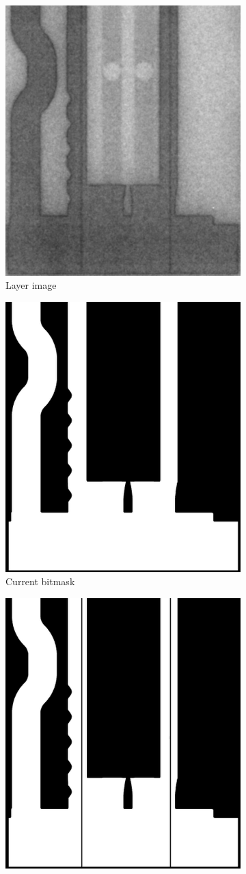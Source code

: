 \begin{figure}[!h]
\centering
\begin{subfigure}{.33\textwidth}
  \centering
  \includegraphics[width=.5\linewidth]{images/introduction/bitmask_integration/layer_00830}
  \caption{Layer image}
\end{subfigure}%
\begin{subfigure}{.33\textwidth}
  \centering
  \includegraphics[width=.5\linewidth]{images/introduction/bitmask_integration/bitmask_00830}
  \caption{Current bitmask}
\end{subfigure}
\begin{subfigure}{.33\textwidth}
  \centering
  \includegraphics[width=.5\linewidth]{images/introduction/bitmask_integration/bitmask_00829}

\end{subfigure}
\end{figure}
